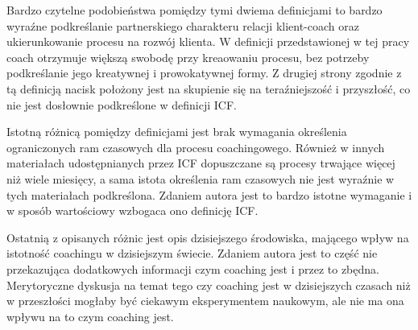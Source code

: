 Bardzo czytelne podobieństwa pomiędzy tymi dwiema definicjami to bardzo wyraźne podkreślanie partnerskiego charakteru relacji klient-coach
oraz ukierunkowanie procesu na rozwój klienta. W definicji przedstawionej w tej pracy coach otrzymuje większą swobodę przy kreaowaniu procesu, bez
potrzeby podkreślanie jego kreatywnej i prowokatywnej formy. Z drugiej strony zgodnie z tą definicją nacisk położony jest na skupienie się na
teraźniejszość i przyszłość, co nie jest dosłownie podkreślone w definicji ICF.

Istotną różnicą pomiędzy definicjami jest brak wymagania określenia ograniczonych ram czasowych dla procesu coachingowego. Również w innych materiałach
udostępnianych przez ICF dopuszczane są procesy trwające więcej niż wiele miesięcy, a sama istota określenia ram czasowych nie jest wyraźnie w tych materiałach
podkreślona. Zdaniem autora jest to bardzo istotne wymaganie i w sposób wartościowy wzbogaca ono definicję ICF.

Ostatnią z opisanych różnic jest opis dzisiejszego środowiska, mającego wpływ na istotność coachingu w dzisiejszym świecie. Zdaniem autora jest to część
nie przekazująca dodatkowych informacji czym coaching jest i przez to zbędna. Merytoryczne dyskusja na temat tego czy coaching jest w dzisiejszych czasach
niż w przeszłości mogłaby być ciekawym eksperymentem naukowym, ale nie ma ona wpływu na to czym coaching jest.
